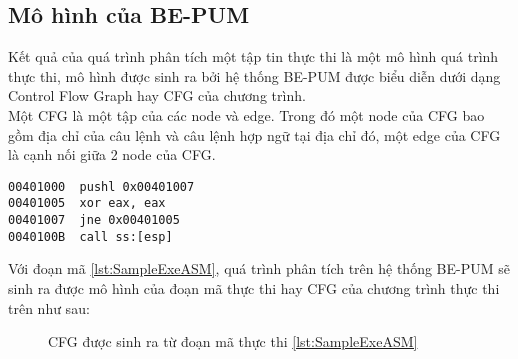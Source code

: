 \subsection{Mô hình của BE-PUM}
\hspace{0.5cm}Kết quả của quá trình phân tích một tập tin thực thi là một mô hình quá trình thực thi, mô hình được sinh ra bởi hệ thống BE-PUM được biểu diễn dưới dạng Control Flow Graph hay CFG của chương trình.\\

\hspace{0.5cm}Một CFG là một tập của các node và edge. Trong đó một node của CFG bao gồm địa chỉ của câu lệnh và câu lệnh hợp ngữ tại địa chỉ đó, một edge của CFG là cạnh nối giữa 2 node của CFG.

\begin{code}
\begin{lstlisting}[captionpos=b,caption={Ví dụ về một đoạn mã thực thi},label={lst:SampleExeASM},frame=single]
00401000  pushl 0x00401007
00401005  xor eax, eax
00401007  jne 0x00401005
0040100B  call ss:[esp]		
\end{lstlisting}
\end{code}

\hspace{0.5cm}Với đoạn mã \ref {lst:SampleExeASM}, quá trình phân tích trên hệ thống BE-PUM sẽ sinh ra được mô hình của đoạn mã thực thi hay CFG của chương trình thực thi trên như sau:

\begin{figure}
\centering
{}
\label{fig:SampleExeCFG}
\caption{CFG được sinh ra từ đoạn mã thực thi \ref {lst:SampleExeASM}}
\end{figure}

